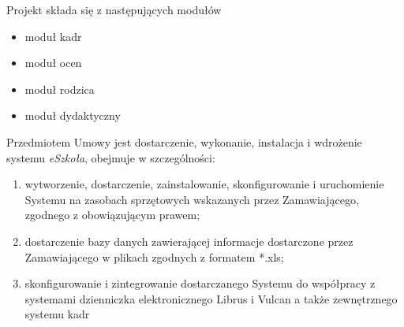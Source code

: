 \documentclass{article}
\begin{document}
Projekt składa się z następujących modułów
\begin{itemize}
    \item moduł kadr
    \item moduł ocen
    \item moduł rodzica
    \item moduł dydaktyczny
\end{itemize}

Przedmiotem Umowy jest dostarczenie, wykonanie, instalacja i wdrożenie systemu \textit{eSzkoła}, obejmuje w szczególności:
\begin{enumerate}
    \item wytworzenie, dostarczenie, zainstalowanie, skonfigurowanie i uruchomienie Systemu na zasobach sprzętowych wskazanych przez Zamawiającego, zgodnego z obowiązującym
    prawem;
    \item dostarczenie bazy danych zawierającej informacje dostarczone przez Zamawiającego w plikach zgodnych z formatem *.xls;
    \item skonfigurowanie i zintegrowanie dostarczanego Systemu do współpracy z systemami dzienniczka elektronicznego Librus i Vulcan
    a także zewnętrznego systemu kadr %
\end{enumerate}
\end{document}
